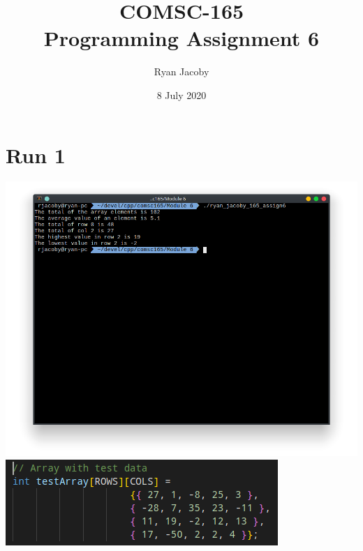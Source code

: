 \documentclass[letterpaper, 11pt]{article}
\title{COMSC-165 \\ Programming Assignment 6}
\author{Ryan Jacoby}
\date{8 July 2020}
\begin{document}
\maketitle

\section*{Run 1}
\includegraphics[scale=0.5]{run1_1.png} \\
\includegraphics[scale=0.5]{run1_2.png}
\end{document}
